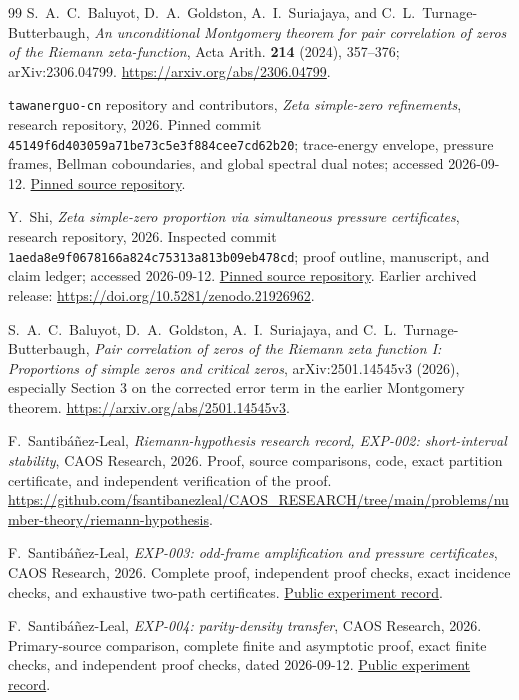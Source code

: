 ﻿\documentclass[11pt]{article}
\theoremstyle{remark}
\begin{document}
\begin{thebibliography}{99}
S.~A.~C.~Baluyot, D.~A.~Goldston, A.~I.~Suriajaya, and C.~L.~Turnage-Butterbaugh,
\emph{An unconditional Montgomery theorem for pair correlation of zeros
of the Riemann zeta-function}, Acta Arith. \textbf{214} (2024), 357--376;
arXiv:2306.04799.
\url{https://arxiv.org/abs/2306.04799}.

\texttt{tawanerguo-cn} repository and contributors,
\emph{Zeta simple-zero refinements}, research repository, 2026.
Pinned commit \texttt{45149f6d403059a71be73c5e3f884cee7cd62b20};
trace-energy envelope, pressure frames, Bellman coboundaries, and global
spectral dual notes; accessed 2026-09-12.
\href{https://github.com/tawanerguo-cn/zeta-simple-zeros/tree/45149f6d403059a71be73c5e3f884cee7cd62b20}{Pinned source repository}.

Y.~Shi,
\emph{Zeta simple-zero proportion via simultaneous pressure certificates},
research repository, 2026. Inspected commit
\texttt{1aeda8e9f0678166a824c75313a813b09eb478cd};
proof outline, manuscript, and claim ledger; accessed 2026-09-12.
\href{https://github.com/yuhangshi888/zeta-simple-zeros-673316977/tree/1aeda8e9f0678166a824c75313a813b09eb478cd}{Pinned source repository}.
Earlier archived release: \url{https://doi.org/10.5281/zenodo.21926962}.

S.~A.~C.~Baluyot, D.~A.~Goldston, A.~I.~Suriajaya, and C.~L.~Turnage-Butterbaugh,
\emph{Pair correlation of zeros of the Riemann zeta function I:
Proportions of simple zeros and critical zeros},
arXiv:2501.14545v3 (2026), especially Section 3 on the
corrected error term in the earlier Montgomery theorem.
\url{https://arxiv.org/abs/2501.14545v3}.

F.~Santib\'a\~nez-Leal,
\emph{Riemann-hypothesis research record, EXP-002: short-interval
stability}, CAOS Research, 2026. Proof, source comparisons, code, exact
partition certificate, and independent verification of the proof.
\url{https://github.com/fsantibanezleal/CAOS_RESEARCH/tree/main/problems/number-theory/riemann-hypothesis}.

F.~Santib\'a\~nez-Leal,
\emph{EXP-003: odd-frame amplification and pressure certificates},
CAOS Research, 2026. Complete proof, independent proof checks, exact
incidence checks, and exhaustive two-path certificates.
\href{https://github.com/fsantibanezleal/CAOS_RESEARCH/tree/main/problems/number-theory/riemann-hypothesis/experiments/EXP-003-odd-frame-pressure}{Public experiment record}.

F.~Santib\'a\~nez-Leal,
\emph{EXP-004: parity-density transfer}, CAOS Research, 2026.
Primary-source comparison, complete finite and asymptotic proof, exact
finite checks, and independent proof checks, dated 2026-09-12.
\href{https://github.com/fsantibanezleal/CAOS_RESEARCH/tree/main/problems/number-theory/riemann-hypothesis/experiments/EXP-004-parity-density-transfer}{Public experiment record}.


\end{thebibliography}
\end{document}
